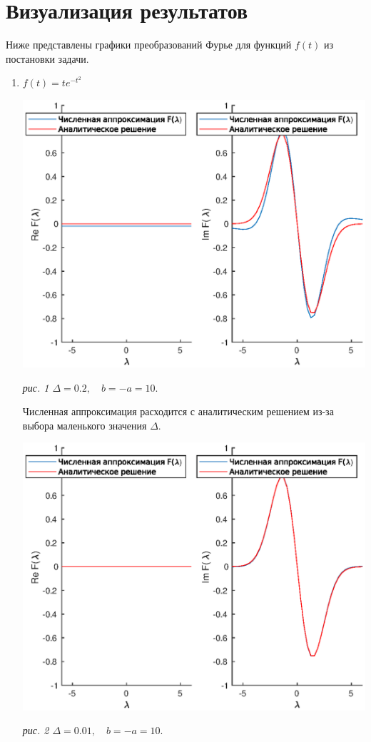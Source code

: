\documentclass[11pt]{article}
\begin{document}
\newpage
\section{Визуализация результатов}
Ниже представлены графики преобразований Фурье для функций $f(t)$ из постановки задачи.
\begin{enumerate}
\item
$ f\left(t\right) = te^{-t^2} $


\noindent

\includegraphics[width=1.0\textwidth]{gr1_2.eps}
\begin{center}
\it{рис. 1 \quad $\Delta = 0.2, \quad b = -a = 10.$}
\end{center}

Численная аппроксимация расходится с аналитическим решением из-за выбора маленького
значения  $\Delta$.

\includegraphics[width=1.0\textwidth]{gr1.eps}
\begin{center}
\it{рис. 2 \quad $\Delta = 0.01, \quad b = -a = 10.$}
\end{center}


\end{enumerate}
\end{document}
